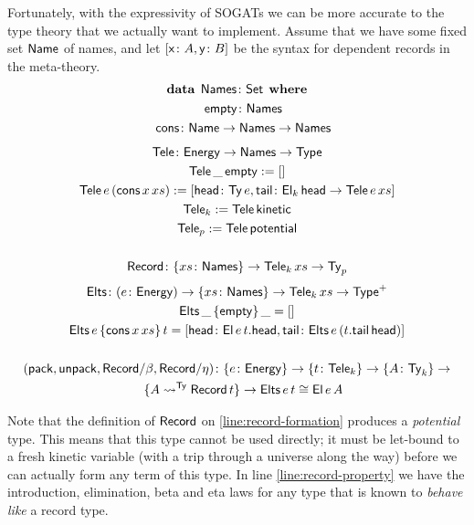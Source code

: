 \documentclass[fleqn,leqno]{article}
\begin{document}
Fortunately, with the expressivity of SOGATs we can be more accurate to the type theory that we actually want to implement. Assume that we have some fixed set $\mathsf{Name}$ of names, and let $[\mathsf{x} \colon A, \mathsf{y} \colon B]$ be the syntax for dependent records in the meta-theory.
\begin{gather}
  \mathbf{data}\:\:\mathsf{Names} \colon \mathsf{Set}\:\:\mathbf{where} \\
  \quad \mathsf{empty} \colon \mathsf{Names} \\
  \quad \mathsf{cons} \colon \mathsf{Name} \to \mathsf{Names} \to \mathsf{Names}
\end{gather}
\begin{gather}
  \mathsf{Tele} \colon \mathsf{Energy} \to \mathsf{Names} \to \mathsf{Type} \\
  \mathsf{Tele}\,\_\,\mathsf{empty} := [] \\
  \mathsf{Tele}\,e\,(\mathsf{cons}\,x\,xs) := [\mathsf{head} \colon \mathsf{Ty}\,e, \mathsf{tail} \colon \mathsf{El}_k\,\mathsf{head} \to \mathsf{Tele}\,e\,xs] \\
  \mathsf{Tele}_k := \mathsf{Tele}\,\mathsf{kinetic} \\
  \mathsf{Tele}_p := \mathsf{Tele}\,\mathsf{potential} \\
  \\
  \mathsf{Record} \colon \{xs \colon \mathsf{Names}\} \to \mathsf{Tele}_k\,xs \to \mathsf{Ty}_p \label{line:record-formation}
\end{gather}
\begin{gather}
  \mathsf{Elts} \colon (e \colon \mathsf{Energy}) \to \{xs \colon \mathsf{Names}\} \to \mathsf{Tele}_k\,xs \to \mathsf{Type}^+ \\
  \mathsf{Elts}\,\_\,\{\mathsf{empty}\}\,\_ = [] \\
  \mathsf{Elts}\,e\,\{\mathsf{cons}\,x\,xs\}\,t = [\mathsf{head} \colon \mathsf{El}\,e\,t.\mathsf{head}, \mathsf{tail} \colon \mathsf{Elts}\,e\,(t.\mathsf{tail}\,\mathsf{head})] \\
  \\
  (\mathsf{pack},\mathsf{unpack},\mathsf{Record}/\beta,\mathsf{Record}/\eta) \colon \{e \colon \mathsf{Energy}\} \to \{t \colon \mathsf{Tele}_k\} \to \{A \colon \mathsf{Ty}_k\} \to \label{line:record-property} \\
  \quad \{A\rightsquigarrow^{\mathsf{Ty}}\mathsf{Record}\,t\} \to \mathsf{Elts}\,e\,t \cong \mathsf{El}\,e\,A
\end{gather}

Note that the definition of $\mathsf{Record}$ on \ref{line:record-formation} produces a \emph{potential} type. This means that this type cannot be used directly; it must be let-bound to a fresh kinetic variable (with a trip through a universe along the way) before we can actually form any term of this type. In line \ref{line:record-property} we have the introduction, elimination, beta and eta laws for any type that is known to \emph{behave like} a record type.
\end{document}

